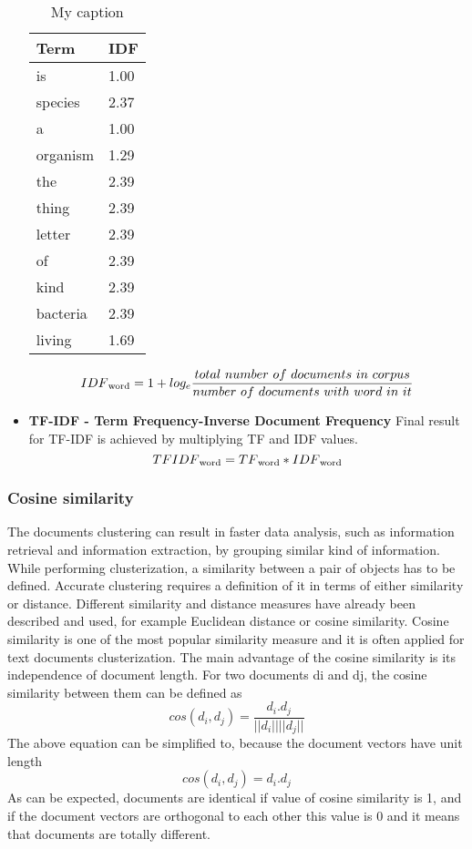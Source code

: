 \begin{itemize}
	
	\begin{table}[H]
		\centering
		\caption{My caption}
		\label{my-label}
		\begin{tabular}{@{}ll@{}}
			\toprule
			Term     & IDF  \\ \midrule
			is       & 1.00 \\
			species  & 2.37 \\
			a        & 1.00 \\
			organism & 1.29 \\
			the      & 2.39 \\
			thing    & 2.39 \\
			letter   & 2.39 \\
			of       & 2.39 \\
			kind     & 2.39 \\
			bacteria & 2.39 \\
			living   & 1.69 \\ \bottomrule
		\end{tabular}
	\end{table}
	
		\[IDF\textsubscript{word}=1+log_e \frac{total\ number\ of\ documents\ in\ corpus}{number\ of\ documents\ with\ word\ in\ it}\]

	\item \textbf{TF-IDF - Term Frequency-Inverse Document Frequency}
	Final result for TF-IDF is achieved by multiplying TF and IDF values.
	\[TFIDF\textsubscript{word}=TF\textsubscript{word} * IDF\textsubscript{word}\]
\end{itemize}

\subsubsection{Cosine similarity}
 The documents clustering can result in faster data analysis, such  as  information
retrieval  and  information  extraction,  by  grouping  similar kind  of  information.
While performing clusterization, a similarity between a pair of objects has to be defined. Accurate clustering requires a definition of it in terms of either similarity or distance. Different similarity and distance measures have already been described and used, for example Euclidean  distance or cosine  similarity. Cosine  similarity  is  one  of  the  most  popular  similarity  measure and it is often  applied for  text  documents clusterization. The main advantage of the cosine similarity is its independence of document length. For two documents di and dj, the cosine similarity between them can be defined as
\[cos(d_i, d_j)=\frac{d_i . d_j}{|| d_i || ||d_j ||}\]
The above equation can be simplified to, because the document vectors have unit length
\[cos(d_i, d_j)={d_i . d_j}\]
As can be expected, documents are identical if value of cosine similarity is 1, and if the 
document vectors are orthogonal to each other this value is 0 and it means that documents are totally different.
